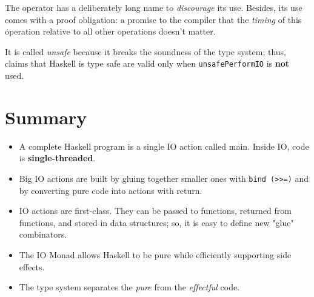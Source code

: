 The operator has a deliberately long name to
\textit{discourage} its use.
Besides, its use comes with a proof obligation:
a promise to the compiler that the \textit{timing} of this operation
relative to all other operations doesn’t matter.

It is called \textit{unsafe} because it breaks the soundness of the type system;
thus, claims that Haskell is type safe are valid only when \lstinline|unsafePerformIO| is \textbf{not} used.

\section{Summary}
\begin{itemize}
   \item A complete Haskell program is a single IO action called
   main. Inside IO, code is \textbf{single-threaded}.
   \item Big IO actions are built by gluing together smaller ones with
   \lstinline|bind (>>=)| and by converting pure code into actions with
   return.
   \item IO actions are first-class.
   They can be passed to functions, returned from functions, and
   stored in data structures; so, it is easy to define new "glue" combinators.
   \item The IO Monad allows Haskell to be pure while efficiently
   supporting side effects.
   \item The type system separates the \textit{pure} from the \textit{effectful} code.
\end{itemize}

